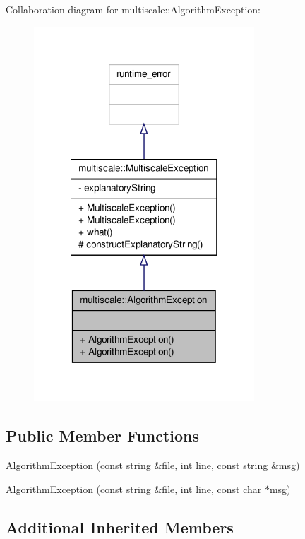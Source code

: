 Collaboration diagram for multiscale\-:\-:Algorithm\-Exception\-:
\nopagebreak
\begin{figure}[H]
\begin{center}
\leavevmode
\includegraphics[width=234pt]{classmultiscale_1_1AlgorithmException__coll__graph}
\end{center}
\end{figure}
\subsection*{Public Member Functions}
\begin{DoxyCompactItemize}
\item 
\hyperlink{classmultiscale_1_1AlgorithmException_a82b64c1819436f13d85f1749c6f0a9a4}{Algorithm\-Exception} (const string \&file, int line, const string \&msg)
\item 
\hyperlink{classmultiscale_1_1AlgorithmException_a8e93ad9821b69a6b4ac459f76b3a82ee}{Algorithm\-Exception} (const string \&file, int line, const char $\ast$msg)
\end{DoxyCompactItemize}
\subsection*{Additional Inherited Members}


